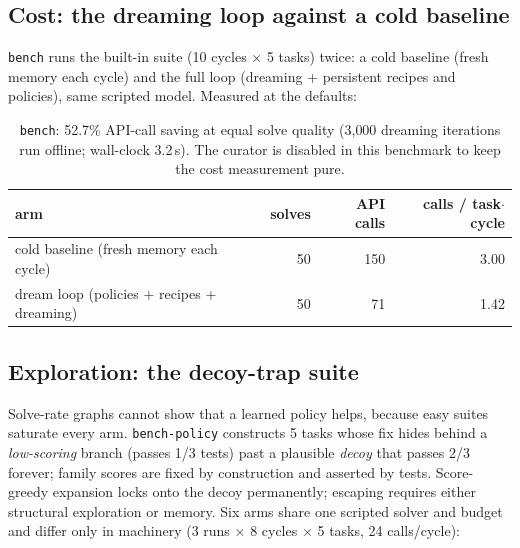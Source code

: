 \documentclass[11pt,a4paper]{article}
\begin{document}
\subsection{Cost: the dreaming loop against a cold baseline}

\texttt{bench} runs the built-in suite (10 cycles $\times$ 5 tasks) twice:
a cold baseline (fresh memory each cycle) and the full loop (dreaming +
persistent recipes and policies), same scripted model. Measured at the
defaults:

\begin{table}[h]
\centering\small
\begin{tabular}{lrrr}
\toprule
arm & solves & API calls & calls / task$\cdot$cycle \\
\midrule
cold baseline (fresh memory each cycle) & 50 & 150 & 3.00 \\
dream loop (policies + recipes + dreaming) & 50 & 71 & 1.42 \\
\bottomrule
\end{tabular}
\caption{\texttt{bench}: 52.7\% API-call saving at equal solve quality
(3{,}000 dreaming iterations run offline; wall-clock 3.2\,s). The curator is
disabled in this benchmark to keep the cost measurement pure.}
\end{table}

\subsection{Exploration: the decoy-trap suite}

Solve-rate graphs cannot show that a learned policy helps, because easy
suites saturate every arm. \texttt{bench-policy} constructs 5 tasks whose fix
hides behind a \emph{low-scoring} branch (passes 1/3 tests) past a plausible
\emph{decoy} that passes 2/3 forever; family scores are fixed by construction
and asserted by tests. Score-greedy expansion locks onto the decoy
permanently; escaping requires either structural exploration or memory.
Six arms share one scripted solver and budget and differ only in machinery
(3 runs $\times$ 8 cycles $\times$ 5 tasks, 24 calls/cycle):
\end{document}

